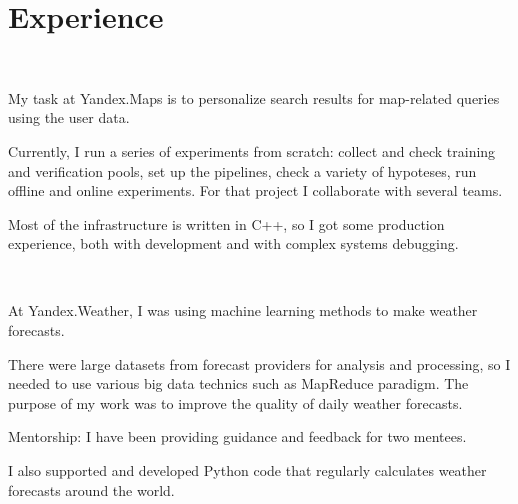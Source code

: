 \documentclass[letterpaper]{deedy-resume} %
\begin{document}
\begin{minipage}[t][0.75\textheight][t]{0.6\textwidth} %


\section{Experience}
\sectionspace

\\
\sectionspace

\vspace{\topsep} %
\begin{tightitemize}
\item My task at Yandex.Maps is to personalize search results for map-related queries using the user data.
\item Currently, I run a series of experiments from scratch: collect and check training and verification pools, set up the pipelines, check a variety of hypoteses, run offline and online experiments. For that project I collaborate with several teams.
\item Most of the infrastructure is written in C++, so I got some production experience, both with development and with complex systems debugging.
\end{tightitemize}

\sectionspace %


\\
\sectionspace

\begin{tightitemize}
\item At Yandex.Weather, I was using machine learning methods to make weather forecasts.
\item There were large datasets from forecast providers for analysis and processing, so I needed to use various big data technics such as MapReduce paradigm. The purpose of my work was to improve the quality of daily weather forecasts.
\item Mentorship: I have been providing guidance and feedback for two mentees.
\item I also supported and developed Python code that regularly calculates weather forecasts around the world.
\end{tightitemize}


\end{minipage}
\end{document}
